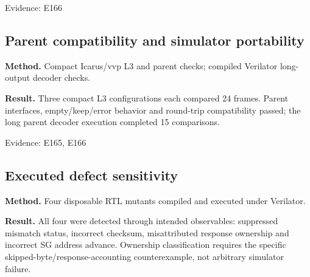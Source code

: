 \documentclass[11pt,a4paper]{article}
\begin{document}
{\small Evidence: E166}

\subsection{Pare\allowbreak{}nt comp\allowbreak{}atib\allowbreak{}ilit\allowbreak{}y and simu\allowbreak{}lato\allowbreak{}r port\allowbreak{}abil\allowbreak{}ity}

\textbf{Method.} Comp\allowbreak{}act Icar\allowbreak{}us/\allowbreak{}vvp L3 and pare\allowbreak{}nt chec\allowbreak{}ks; comp\allowbreak{}iled Veri\allowbreak{}lato\allowbreak{}r long-outp\allowbreak{}ut deco\allowbreak{}der chec\allowbreak{}ks.

\textbf{Result.} Thre\allowbreak{}e comp\allowbreak{}act L3 conf\allowbreak{}igur\allowbreak{}atio\allowbreak{}ns each comp\allowbreak{}ared 24 fram\allowbreak{}es. Pare\allowbreak{}nt inte\allowbreak{}rfac\allowbreak{}es,\allowbreak{} empt\allowbreak{}y/\allowbreak{}keep/\allowbreak{}erro\allowbreak{}r beha\allowbreak{}vior and roun\allowbreak{}d-trip comp\allowbreak{}atib\allowbreak{}ilit\allowbreak{}y pass\allowbreak{}ed; the long pare\allowbreak{}nt deco\allowbreak{}der exec\allowbreak{}utio\allowbreak{}n comp\allowbreak{}lete\allowbreak{}d 15 comp\allowbreak{}aris\allowbreak{}ons.

{\small Evidence: E165,\allowbreak{} E166}

\subsection{Exec\allowbreak{}uted defe\allowbreak{}ct sens\allowbreak{}itiv\allowbreak{}ity}

\textbf{Method.} Four disp\allowbreak{}osab\allowbreak{}le RTL muta\allowbreak{}nts comp\allowbreak{}iled and exec\allowbreak{}uted unde\allowbreak{}r Veri\allowbreak{}lato\allowbreak{}r.

\textbf{Result.} All four were dete\allowbreak{}cted thro\allowbreak{}ugh inte\allowbreak{}nded obse\allowbreak{}rvab\allowbreak{}les: supp\allowbreak{}ress\allowbreak{}ed mism\allowbreak{}atch stat\allowbreak{}us,\allowbreak{} inco\allowbreak{}rrec\allowbreak{}t chec\allowbreak{}ksum,\allowbreak{} misa\allowbreak{}ttri\allowbreak{}bute\allowbreak{}d resp\allowbreak{}onse owne\allowbreak{}rshi\allowbreak{}p and inco\allowbreak{}rrec\allowbreak{}t SG addr\allowbreak{}ess adva\allowbreak{}nce. Owne\allowbreak{}rshi\allowbreak{}p clas\allowbreak{}sifi\allowbreak{}cati\allowbreak{}on requ\allowbreak{}ires the spec\allowbreak{}ific skip\allowbreak{}ped-byte/\allowbreak{}resp\allowbreak{}onse-acco\allowbreak{}unti\allowbreak{}ng coun\allowbreak{}tere\allowbreak{}xamp\allowbreak{}le,\allowbreak{} not arbi\allowbreak{}trar\allowbreak{}y simu\allowbreak{}lato\allowbreak{}r fail\allowbreak{}ure.
\end{document}
